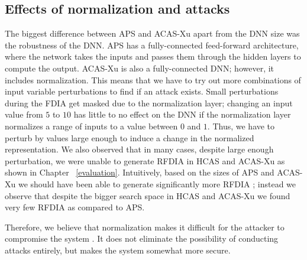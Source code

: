 \subsection{Effects of normalization and attacks}
The biggest difference between \ac{APS} and \ac{ACAS-Xu} apart from the \ac{DNN} size was the robustness of the \ac{DNN}. 
\ac{APS} has a fully-connected feed-forward architecture, where the network takes the inputs and passes them through the hidden layers to compute the output. 
\ac{ACAS-Xu} is also a fully-connected \ac{DNN}; however, it includes normalization.
This means that we have to try out more combinations of input variable perturbations to find if an attack exists. 
Small perturbations during the \ac{FDIA} get masked due to the normalization layer; changing an input value from $5$ to $10$ has little to no effect on the \ac{DNN} if the normalization layer normalizes a range of inputs to a value between $0$ and $1$. 
Thus, we have to perturb  by values large enough to induce a change in the normalized representation. 
We also observed that in many cases, despite large enough perturbation, we were unable to generate \ac{RFDIA} in \ac{HCAS} and \ac{ACAS-Xu} as shown in Chapter ~\ref{evaluation}.
Intuitively, based on the sizes of \ac{APS} and \ac{ACAS-Xu} we should have been able to generate significantly more \ac{RFDIA} ; instead we observe that despite the bigger search space in \ac{HCAS} and \ac{ACAS-Xu} we found very few \ac{RFDIA} as compared to \ac{APS}. 

Therefore, we believe that normalization makes it difficult for the attacker to compromise the system . 
It does not eliminate the possibility of conducting attacks entirely, but makes the system somewhat more secure.  

